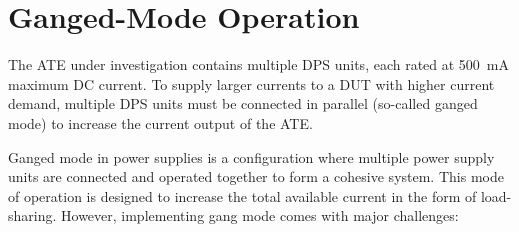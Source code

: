 

\section{Ganged-Mode Operation}
\label{sec:ganged-mode-operation}

The \ac{ATE} under investigation contains multiple \ac{DPS} units, each rated
at \SI{500}{\milli\ampere} maximum \acs{DC} current.
To supply larger currents to a \ac{DUT} with higher current demand,
multiple \ac{DPS} units must be connected in parallel
(so-called ganged mode) to increase the current output of the \ac{ATE}.

Ganged mode in power supplies is a configuration where multiple power supply
units are connected and operated together to form a cohesive system.
This mode of operation is designed to increase the total available
current in the form of load-sharing.
However, implementing gang mode comes with major challenges:

